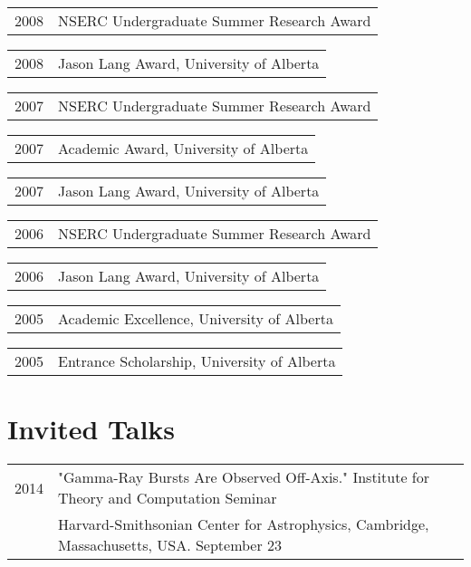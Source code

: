 \documentclass[letterpaper]{article}
\renewenvironment{itemize}{
  \begin{list}{}{
    \setlength{\leftmargin}{1.5em}
  }
}{
  \end{list}
}
\begin{document}
\begin{itemize}
\item \begin{tabular}{ll}
2008 & NSERC Undergraduate Summer Research Award
\end{tabular}

\item \begin{tabular}{ll}
2008 & Jason Lang Award, University of Alberta
\end{tabular}

\item \begin{tabular}{ll}
2007 & NSERC Undergraduate Summer Research Award
\end{tabular}

\item \begin{tabular}{ll}
2007 & Academic Award, University of Alberta
\end{tabular}

\item \begin{tabular}{ll}
2007 & Jason Lang Award, University of Alberta
\end{tabular}

\item \begin{tabular}{ll}
2006 & NSERC Undergraduate Summer Research Award
\end{tabular}

\item \begin{tabular}{ll}
2006 & Jason Lang Award, University of Alberta
\end{tabular}

\item \begin{tabular}{ll}
2005 & Academic Excellence, University of Alberta
\end{tabular}

\item \begin{tabular}{ll}
2005 & Entrance Scholarship, University of Alberta
\end{tabular}

\end{itemize}

\section*{Invited Talks}
\begin{itemize}
\item \begin{tabular}{ll}
2014 & "Gamma-Ray Bursts Are Observed Off-Axis." Institute for Theory and Computation Seminar  \\
	& Harvard-Smithsonian Center for Astrophysics, Cambridge, Massachusetts, USA.  September 23
\end{tabular}
\end{itemize}
\end{document}
